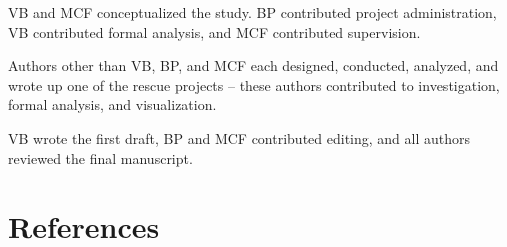 \documentclass[
  english,
  a4paper,
]{article}
\begin{document}
VB and MCF conceptualized the study.
BP contributed project administration, VB contributed formal analysis, and MCF contributed supervision.

Authors other than VB, BP, and MCF each designed, conducted, analyzed, and wrote up one of the rescue projects -- these authors contributed to investigation, formal analysis, and visualization.

VB wrote the first draft, BP and MCF contributed editing, and all authors reviewed the final manuscript.

\section*{References}\label{references}

\label{refs}
\end{document}
